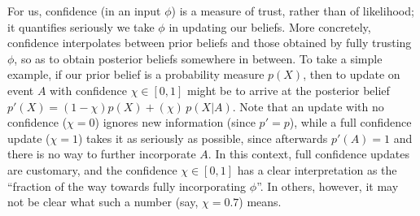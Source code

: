 For us, confidence (in an input $\phi$) is a measure of trust, rather than of likelihood;
it quantifies seriously we take $\phi$ in updating our beliefs.
More concretely, confidence interpolates between prior beliefs and those obtained by fully trusting $\phi$, so as to obtain posterior beliefs somewhere in between. 
To take a simple example,
if our prior belief is a probability measure $p(X)$, then to update on event $A$ with confidence $\chi \in [0,1]$ might be to arrive at the posterior belief $p'(X) = (1-\chi) p(X) + (\chi)\, p(X|A)$. 
Note that 
an update with no confidence ($\chi{=}0$) ignores new information (since $p' \!=\! p$),
while a
full confidence update ($\chi{=}1$) takes it as seriously as possible,
since afterwards $p'(A) \!=\! 1$ and there is no way to further incorporate $A$.
%
In this context, 
full confidence updates are customary, and
the confidence $\chi \in [0,1]$ has a clear interpretation as the ``fraction of the way towards fully incorporating $\phi$''.
In others, however, it may not be clear what 
 	such a number (say, $\chi=0.7$) means.

